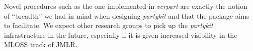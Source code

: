 \documentclass{article}
\begin{document}
Novel procedures such as the one implemented in \emph{vcrpart} are exactly the
notion of ``breadth'' we had in mind when designing \emph{partykit} and that
the package aims to facilitate. We expect other research groups to pick up the
\emph{partykit} infrastructure in the future, especially if it is given increased
visibility in the MLOSS track of JMLR.



\end{document}
